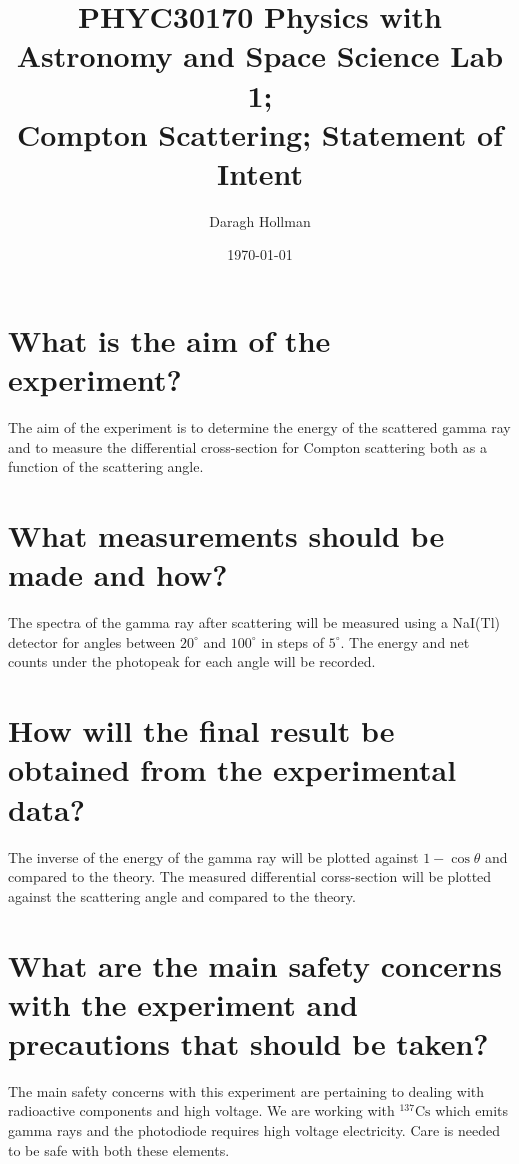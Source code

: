 \documentclass[%
reprint,
amsmath,amssymb,
aps,
]{revtex4-2}
\begin{document}
	\title{PHYC30170 Physics with Astronomy and Space Science Lab 1;\\
	Compton Scattering; Statement of Intent}
	
	\author{Daragh Hollman}
	
	\date{\today}
	
	\maketitle
	
	\onecolumngrid
	\section{What is the aim of the experiment?}
		The aim of the experiment is to determine the energy of the scattered gamma ray and to measure the differential cross-section for Compton scattering both as a function of the scattering angle.
	
	\section{What measurements should be made and how?}
		The spectra of the gamma ray after scattering will be measured using a NaI(Tl) detector for angles between $20^\circ$ and $100^\circ$ in steps of $5^\circ$. The energy and net counts under the photopeak for each angle will be recorded.		
	
	\section{How will the final result be obtained from the experimental data?}
		The inverse of the energy of the gamma ray will be plotted against $1-\cos{\theta}$ and compared to the theory. The measured differential corss-section will be plotted against the scattering angle and compared to the theory.
		
	
	\section{What are the main safety concerns with the experiment and precautions that should be taken?}
		The main safety concerns with this experiment are pertaining to dealing with radioactive components and high voltage. We are working with $^{137}\text{Cs}$ which emits gamma rays and the photodiode requires high voltage electricity. Care is needed to be safe with both these elements.
	
\end{document}
